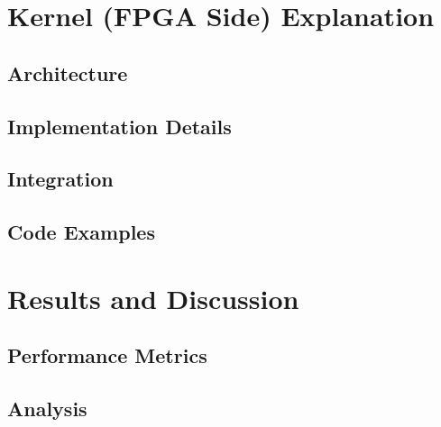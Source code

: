 \documentclass[12pt,oneside,a4paper]{article}
\begin{document}

\section{Kernel (FPGA Side) Explanation}

\subsection{Architecture}

\subsection{Implementation Details}

\subsection{Integration}

\subsection{Code Examples}





\section{Results and Discussion}

\subsection{Performance Metrics}

\subsection{Analysis}
\end{document}
